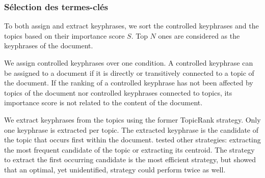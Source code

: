       \subsubsection{Sélection des termes-clés}
      \label{subsubsec:main-automatic_keyphrase_annotation-supervised_automatic_keyphrase_extraction-topiccorank-keyphrase_selection}
        To both assign and extract keyphrases, we sort the controlled
        keyphrases and the topics based on their importance score $S$. Top $N$ ones are
        considered as the keyphrases of the document.

        We assign controlled keyphrases over one condition. A controlled keyphrase can
        be assigned to a document if it is directly or transitively connected to a
        topic of the document. If the ranking of a controlled keyphrase has not been
        affected by topics of the document nor controlled keyphrases connected to topics,
        its importance score is not related to the content of the document.

        We extract keyphrases from the topics using the former TopicRank strategy.
        Only one keyphrase is extracted per topic. The extracted keyphrase is the
        candidate of the topic that occurs first within the document.
         tested other strategies: extracting the most
        frequent candidate of the topic or extracting its centroid. The strategy to
        extract the first occurring candidate is the most efficient strategy, but
         showed that an optimal, yet unidentified, strategy could
        perform twice as well.

        

